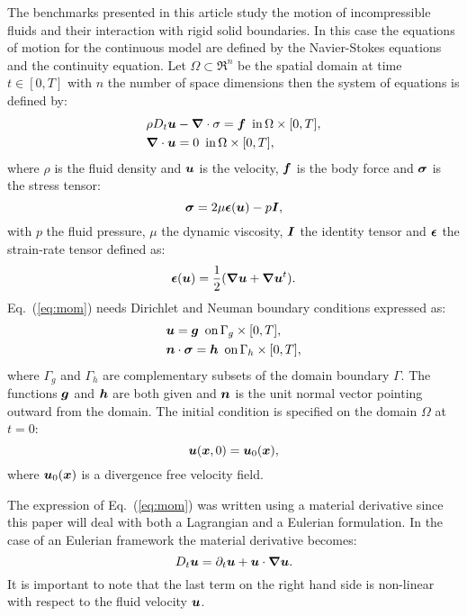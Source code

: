 The benchmarks presented in this article study the motion of incompressible fluids and their interaction with rigid solid boundaries. In this case the equations of motion for the continuous model are defined by the Navier-Stokes equations and the continuity equation. Let $\Omega\subset \Re^n$ be the spatial domain at time $t\in[0,T]$ with $n$ the number of space dimensions then the system of equations is defined by:
%
\begin{eqnarray}
&\rho D_t\boldsymbol{u}-\boldsymbol{\nabla}\cdot\sigma=\boldsymbol{f} \,\,\, \text{in}\, \Omega\times[0,T], \label{eq:mom}\\
&\boldsymbol{\nabla}\cdot \boldsymbol{u}=0 \label{eq:cont} \,\,\, \text{in}\, \Omega\times[0,T],
\end{eqnarray}
%
where $\rho$ is the fluid density and $\boldsymbol{u}$ is the velocity, $\boldsymbol{f}$ is the body force and $\boldsymbol{\sigma}$ is the stress tensor:
%
\begin{equation}
\boldsymbol{\sigma}=2\mu\boldsymbol{\epsilon}(\boldsymbol{u})-p\boldsymbol{I},
\end{equation}
%
with $p$ the fluid pressure, $\mu$ the dynamic viscosity, $\boldsymbol{I}$ the identity tensor and $\boldsymbol{\epsilon}$ the strain-rate tensor defined as:
%
\begin{equation}
  \boldsymbol{\epsilon}(\boldsymbol{u})=\frac{1}{2}(\boldsymbol{\nabla}\boldsymbol{u}+\boldsymbol{\nabla}\boldsymbol{u}^t).
\end{equation}
%
Eq.~(\ref{eq:mom}) needs Dirichlet and Neuman boundary conditions expressed as:
%
\begin{eqnarray}
  &\boldsymbol{u}=\boldsymbol{g} \,\,\, \text{on}\, \Gamma_g\times[0,T],\\
  &\boldsymbol{n}\cdot\boldsymbol{\sigma}=\boldsymbol{h} \,\,\, \text{on}\, \Gamma_h\times[0,T],
\end{eqnarray}
%
where $\Gamma_g$ and $\Gamma_h$ are complementary subsets of the domain boundary $\Gamma$. The functions $\boldsymbol{g}$ and $\boldsymbol{h}$ are both given and $\boldsymbol{n}$ is the unit normal vector pointing outward from the domain.
The initial condition is specified on the domain $\Omega$ at $t=0$:
%
\begin{equation}
  \boldsymbol{u}(\boldsymbol{x},0)=\boldsymbol{u}_0(\boldsymbol{x}),
\end{equation}
%
where $\boldsymbol{u}_0(\boldsymbol{x})$ is a divergence free velocity field.

The expression of Eq.~(\ref{eq:mom}) was written using a material derivative since this paper will deal with both a Lagrangian and a Eulerian formulation. In the case of an Eulerian framework the material derivative becomes:
\begin{equation}
D_t\boldsymbol{u}=\partial_t\boldsymbol{u}+\boldsymbol{u} \cdot \boldsymbol{\nabla}\boldsymbol{u}.
\end{equation}
It is important to note that the last term on the right hand side is non-linear with respect to the fluid velocity $\boldsymbol{u}$.
